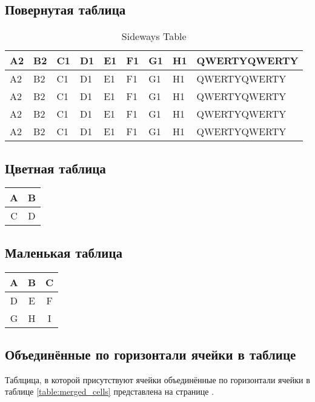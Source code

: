 \subsection{Повернутая таблица}
\begin{sidewaystable}
\centering
\caption{Sideways Table}
\begin{tabular}{|l|l|l|l|l|l|l|l|l| }
\hline
A2 & B2 & C1 & D1 & E1 & F1 & G1 & H1 & QWERTYQWERTY \\
\hline
A2 & B2 & C1 & D1 & E1 & F1 & G1 & H1 & QWERTYQWERTY \\
\hline
A2 & B2 & C1 & D1 & E1 & F1 & G1 & H1 & QWERTYQWERTY \\
\hline
A2 & B2 & C1 & D1 & E1 & F1 & G1 & H1 & QWERTYQWERTY \\
\hline
A2 & B2 & C1 & D1 & E1 & F1 & G1 & H1 & QWERTYQWERTY \\
\hline
\end{tabular}
\end{sidewaystable}
\clearpage

\subsection{Цветная таблица}
\begin{tabular}{|c|c|}
    \hline
    \cellcolor{purple!30}A & \cellcolor{pink!60}B \\
    \hline
    \cellcolor{red!40}C & \cellcolor{orange!50}D \\
    \hline
\end{tabular}

\subsection{Маленькая таблица}

\setlength{\arrayrulewidth}{1.5pt}
\begin{tabular}{|c|c|c|}
    \hline
    A & B & C \\
    \hline
    D & E & F \\
    \hline
    G & H & I \\
    \hline
\end{tabular}

\subsection{Объединённые по горизонтали ячейки в таблице}
Таблцица, в которой присутствуют ячейки объединённые по горизонтали ячейки в таблице \ref{table:merged_cells} представлена на странице \pageref{table:merged_cells}.\\


